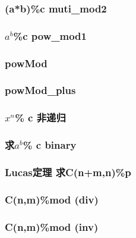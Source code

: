 \documentclass[a4paper]{article}
\begin{document}
\begin{CJK*}{UTF8}{gbsn}
\begin{multicols}{3}
\begin{flushleft}
\subsubsection{(a*b)\%c  muti\_mod2}


\subsubsection{\texorpdfstring{$a^b$}.\%c pow\_mod1}


\subsubsection{powMod}


\subsubsection{powMod\_plus}


\subsubsection{\texorpdfstring{$x^n$}.\% c 非递归}


\subsubsection{求\texorpdfstring{$a^b$}.\% c binary}


\subsubsection{Lucas定理 求C(n+m,n)\%p}


\subsubsection{C(n,m)\%mod (div)}


\subsubsection{C(n,m)\%mod (inv)}



\end{flushleft}
\end{multicols}
\end{CJK*}
\end{document}
